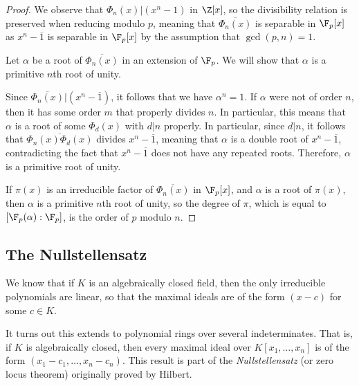 \documentclass[10pt]{mypackage}
\begin{document}
\begin{proof}
  We observe that $ \Phi_n(x) | \left( x^{n}-1 \right) $ in $\Z[x]$, so the divisibility relation is preserved when reducing modulo $p$, meaning that $ \overline{\Phi_n(x)} $ is separable in $\F_p[x]$ as $ x^{n} - \overline{1} $ is separable in $\F_p[x]$ by the assumption that $\gcd\left( p,n \right) = 1$.

  Let $\alpha$ be a root of $ \overline{\Phi_n(x)} $ in an extension of $\F_p$. We will show that $\alpha$ is a primitive $n$th root of unity.

  Since $ \overline{\Phi_n(x)} | \left( x^{n} - \overline{1}\right) $, it follows that we have $\alpha^{n} = 1$. If $\alpha$ were not of order $n$, then it has some order $m$ that properly divides $n$. In particular, this means that $\alpha$ is a root of some $\Phi_d(x)$ with $d | n$ properly. In particular, since $d | n$, it follows that $ \overline{\Phi_n(x)\Phi_d(x)} $ divides $x^{n}- \overline{1}$, meaning that $\alpha$ is a double root of $x^{n} - \overline{1}$, contradicting the fact that $x^{n} - \overline{1}$ does not have any repeated roots. Therefore, $\alpha$ is a primitive root of unity.

  If $\pi(x)$ is an irreducible factor of $ \overline{\Phi_n(x)} $ in $\F_p[x]$, and $\alpha$ is a root of $\pi(x)$, then $\alpha$ is a primitive $n$th root of unity, so the degree of $\pi$, which is equal to $ \left[ \F_p(\alpha):\F_p \right] $, is the order of $p$ modulo $n$.
\end{proof}
\subsection{The Nullstellensatz}%
We know that if $K$ is an algebraically closed field, then the only irreducible polynomials are linear, so that the maximal ideals are of the form $\left( x-c \right)$ for some $c\in K$. 

It turns out this extends to polynomial rings over several indeterminates. That is, if $K$ is algebraically closed, then every maximal ideal over $K\left[ x_1,\dots,x_n \right]$ is of the form $\left( x_1-c_1,\dots,x_n-c_n \right)$. This result is part of the \textit{Nullstellensatz} (or zero locus theorem) originally proved by Hilbert.
\end{document}
